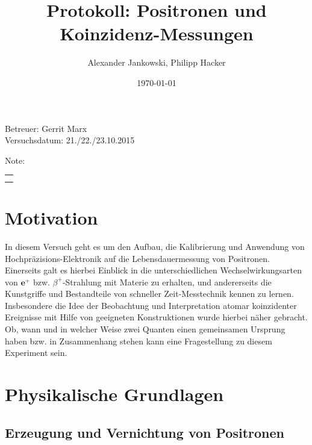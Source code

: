 \documentclass[numbers=noenddot,a4paper]{scrartcl}
\title{Protokoll: Positronen und Koinzidenz-Messungen} %
\author{Alexander Jankowski, Philipp Hacker}
\date{\today}
\begin{document}
	\maketitle
	\begin{center}
		Betreuer: Gerrit Marx\\ %
		Versuchsdatum: 21./22./23.10.2015\\ %
		\begin{table}[h]
			\centering
			Note: %
			\begin{tabularx}{1.5cm}{|X|}
				\hline \\ \\
				\hline
			\end{tabularx}
		\end{table}
	\end{center}
	\vspace*{\fill}
	\tableofcontents
	\vfill
	\newpage
	\section{Motivation}

	In diesem Versuch geht es um den Aufbau, die Kalibrierung und Anwendung von Hochpräzisions-Elektronik auf die Lebensdauermessung von Positronen. Einerseits galt es hierbei Einblick in die unterschiedlichen Wechselwirkungsarten von $\textbf{e}^+$ bzw. $\beta^+$-Strahlung mit Materie zu erhalten, und andererseits die Kunstgriffe und Bestandteile von schneller Zeit-Messtechnik kennen zu lernen. Insbesondere die Idee der Beobachtung und Interpretation atomar koinzidenter Ereignisse mit Hilfe von geeigneten Konstruktionen wurde hierbei näher gebracht. Ob, wann und in welcher Weise zwei Quanten einen gemeinsamen Ursprung haben bzw. in Zusammenhang stehen kann eine Fragestellung zu diesem Experiment sein.

	\newpage
	\section{Physikalische Grundlagen}

		\subsection{Erzeugung und Vernichtung von Positronen}\label{subsec:psoitronen}
	
\end{document}
